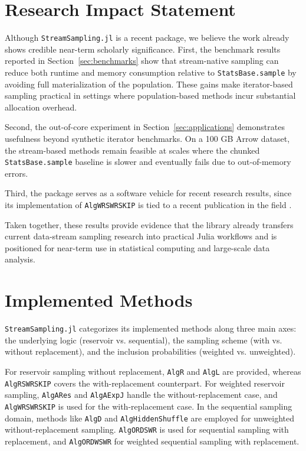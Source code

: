 \documentclass{juliacon}
\begin{document}
\section{Research Impact Statement}

Although \texttt{StreamSampling.jl} is a recent package, we believe the work already shows credible near-term scholarly significance. First, the benchmark results reported in Section~\ref{sec:benchmarks} show that stream-native sampling can reduce both runtime and memory consumption relative to \texttt{StatsBase.sample} by avoiding full materialization of the population. These gains make iterator-based sampling practical in settings where population-based methods incur substantial allocation overhead.

Second, the out-of-core experiment in Section~\ref{sec:applications} demonstrates usefulness beyond synthetic iterator benchmarks. On a 100 GB Arrow dataset, the stream-based methods remain feasible at scales where the chunked \texttt{StatsBase.sample} baseline is slower and eventually fails due to out-of-memory errors.

Third, the package serves as a software vehicle for recent research results, since its implementation of \texttt{AlgWRSWRSKIP} is tied to a recent publication in the field \cite{meligrana2026weighted}.

Taken together, these results provide evidence that the library already transfers current data-stream sampling research into practical Julia workflows and is positioned for near-term use in statistical computing and large-scale data analysis.

\section{Implemented Methods}

\texttt{StreamSampling.jl} categorizes its implemented methods along three main axes: the underlying logic (reservoir vs. sequential), the sampling scheme (with vs. without replacement), and the inclusion probabilities (weighted vs. unweighted).

For reservoir sampling without replacement, \texttt{AlgR} and \texttt{AlgL} \cite{vitter1985random} are provided, whereas \texttt{AlgRSWRSKIP} \cite{park2004reservoir} covers the with-replacement counterpart. For weighted reservoir sampling, \texttt{AlgARes} and \texttt{AlgAExpJ} \cite{efraimidis2006weighted} handle the without-replacement case, and \texttt{AlgWRSWRSKIP} \cite{meligrana2026weighted} is used for the with-replacement case.
In the sequential sampling domain, methods like \texttt{AlgD} \cite{vitter1987efficient} and \texttt{AlgHiddenShuffle} \cite{shekelyan2021sequential} are employed for unweighted without-replacement sampling. \texttt{AlgORDSWR} \cite{bentley1980generating} is used for sequential sampling with replacement, and \texttt{AlgORDWSWR} \cite{startek2016asymptotically} for weighted sequential sampling with replacement.
\end{document}
